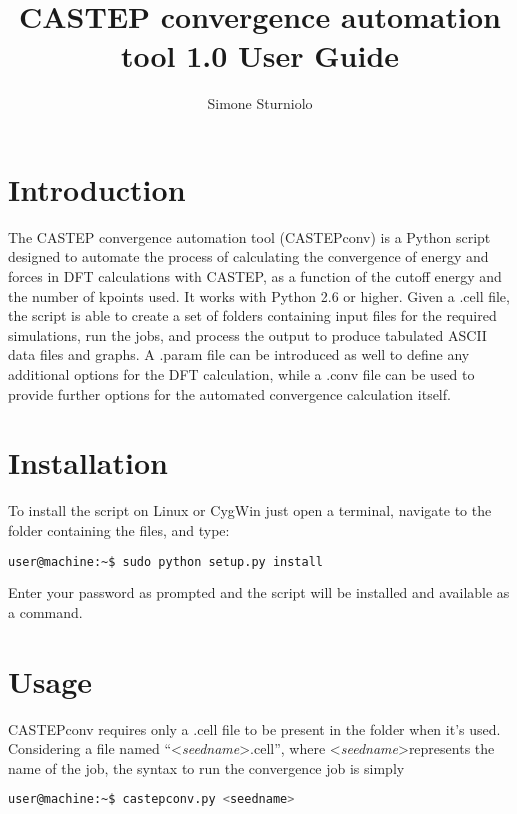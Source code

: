 \documentclass[10pt]{article}
\title{CASTEP convergence automation tool 1.0 User Guide}
\author{Simone Sturniolo}
\begin{document}
\maketitle

\section{Introduction}

The CASTEP convergence automation tool (CASTEPconv) is a Python script designed 
to automate the process of calculating the convergence of energy and forces in 
DFT calculations with CASTEP, as a function of the cutoff energy and the number 
of kpoints used. It works with Python 2.6 or higher. Given a .cell file, the 
script is able to create a set of folders containing input files for the 
required simulations, run the jobs, and process the output to produce tabulated 
ASCII data files and graphs. A .param file can be introduced as well to define 
any additional options for the DFT calculation, while a .conv file can be used 
to provide further options for the automated convergence calculation itself.

\section{Installation}

To install the script on Linux or CygWin just open a terminal, navigate to the 
folder containing the files, and type:

\begin{lstlisting}[language=Bash]
 user@machine:~$ sudo python setup.py install
\end{lstlisting}

Enter your password as prompted and the script will be installed and available 
as a command.

\section{Usage}

CASTEPconv requires only a .cell file to be present in the folder when it's 
used. Considering a file named ``\textless \textit{seedname}\textgreater.cell'', 
where \textless \textit{seedname}\textgreater represents the name of the job, 
the syntax to run the convergence job is simply

\begin{lstlisting}[language=Bash]
 user@machine:~$ castepconv.py <seedname>
\end{lstlisting}
\end{document}
